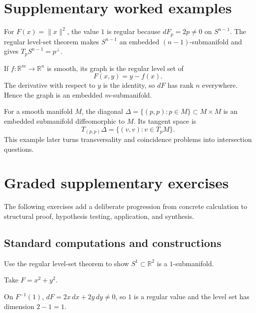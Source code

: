 \section{Supplementary worked examples}
\label{sec:vii06-pedagogy}

\begin{example}\label{ex:vii06-ped-01}
For \(F(x)=\lVert x\rVert^2\), the value \(1\) is regular because \(dF_p=2p\neq0\) on \(S^{n-1}\).  The regular level-set theorem makes \(S^{n-1}\) an embedded \((n-1)\)-submanifold and gives \(T_pS^{n-1}=p^\perp\).
\end{example}

\begin{example}\label{ex:vii06-ped-02}
If \(f:\mathbb R^m\to\mathbb R^n\) is smooth, its graph is the regular level set of
\[
F(x,y)=y-f(x).
\]
The derivative with respect to \(y\) is the identity, so \(dF\) has rank \(n\) everywhere.  Hence the graph is an embedded \(m\)-submanifold.
\end{example}

\begin{example}\label{ex:vii06-ped-03}
For a smooth manifold \(M\), the diagonal \(\Delta=\{(p,p):p\in M\}\subset M\times M\) is an embedded submanifold diffeomorphic to \(M\).  Its tangent space is
\[
T_{(p,p)}\Delta=\{(v,v):v\in T_pM\}.
\]
This example later turns transversality and coincidence problems into intersection questions.
\end{example}

\section{Graded supplementary exercises}
The following exercises add a deliberate progression from concrete calculation to structural proof, hypothesis testing, application, and synthesis.

\subsection*{Standard computations and constructions}

\begin{exercise}\label{exr:vii06-ped-01}
Use the regular level-set theorem to show \(S^1\subset\mathbb R^2\) is a \(1\)-submanifold.
\end{exercise}
\begin{hint}
Take \(F=x^2+y^2\).
\end{hint}
\begin{solution}
On \(F^{-1}(1)\), \(dF=2x\,dx+2y\,dy\neq0\), so \(1\) is a regular value and the level set has dimension \(2-1=1\).
\end{solution}

